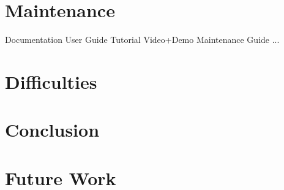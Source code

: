 \section{Maintenance}
    Documentation
    User Guide
    Tutorial Video+Demo
    Maintenance Guide ...

\section{Difficulties}

\section{Conclusion}

\section{Future Work}